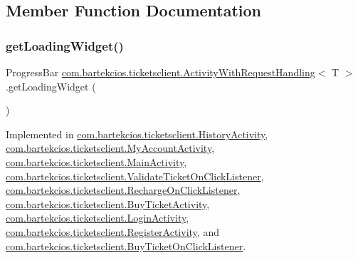 \subsection{Member Function Documentation}
\mbox{\label{interfacecom_1_1bartekcios_1_1ticketsclient_1_1_activity_with_request_handling_a2f8df8eb56e9ff841af1d6ce4726fdad}} 
\subsubsection{\texorpdfstring{get\+Loading\+Widget()}{getLoadingWidget()}}
{\footnotesize\ttfamily Progress\+Bar \hyperlink{interfacecom_1_1bartekcios_1_1ticketsclient_1_1_activity_with_request_handling}{com.\+bartekcios.\+ticketsclient.\+Activity\+With\+Request\+Handling}$<$ T $>$.get\+Loading\+Widget (\begin{DoxyParamCaption}{ }\end{DoxyParamCaption})}



Implemented in \hyperlink{classcom_1_1bartekcios_1_1ticketsclient_1_1_history_activity_ae2325aef822a47c50ba357b74a212519}{com.\+bartekcios.\+ticketsclient.\+History\+Activity}, \hyperlink{classcom_1_1bartekcios_1_1ticketsclient_1_1_my_account_activity_ae072a66ad70be5fcdae7fa2cab045eab}{com.\+bartekcios.\+ticketsclient.\+My\+Account\+Activity}, \hyperlink{classcom_1_1bartekcios_1_1ticketsclient_1_1_main_activity_a71f7b835ae25d0ababb77617c2051753}{com.\+bartekcios.\+ticketsclient.\+Main\+Activity}, \hyperlink{classcom_1_1bartekcios_1_1ticketsclient_1_1_validate_ticket_on_click_listener_a128c705950b8ebeb7f257a25646c681e}{com.\+bartekcios.\+ticketsclient.\+Validate\+Ticket\+On\+Click\+Listener}, \hyperlink{classcom_1_1bartekcios_1_1ticketsclient_1_1_recharge_on_click_listener_aec7599a1a9419e463f06d8d523642ffe}{com.\+bartekcios.\+ticketsclient.\+Recharge\+On\+Click\+Listener}, \hyperlink{classcom_1_1bartekcios_1_1ticketsclient_1_1_buy_ticket_activity_a72eb609d70c9934ed8c218284eec41b8}{com.\+bartekcios.\+ticketsclient.\+Buy\+Ticket\+Activity}, \hyperlink{classcom_1_1bartekcios_1_1ticketsclient_1_1_login_activity_a86e8b2d53263f0523545c55c65643ea5}{com.\+bartekcios.\+ticketsclient.\+Login\+Activity}, \hyperlink{classcom_1_1bartekcios_1_1ticketsclient_1_1_register_activity_a9e9e4809b906f4cc40206841cf037117}{com.\+bartekcios.\+ticketsclient.\+Register\+Activity}, and \hyperlink{classcom_1_1bartekcios_1_1ticketsclient_1_1_buy_ticket_on_click_listener_a6b4d6ca6de0708fe070bf91b4f9424c1}{com.\+bartekcios.\+ticketsclient.\+Buy\+Ticket\+On\+Click\+Listener}.

